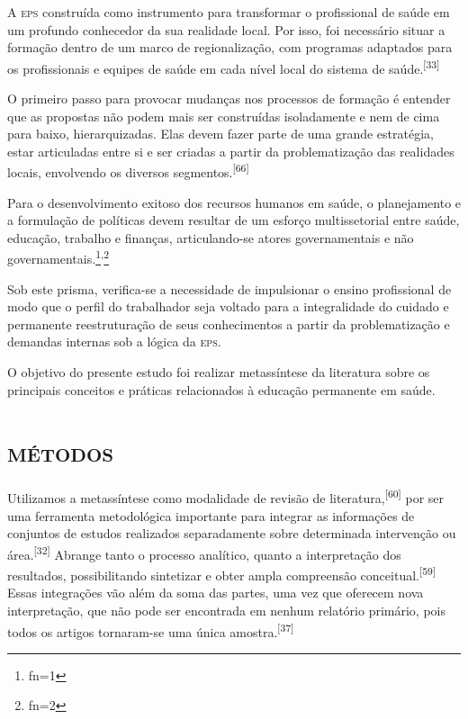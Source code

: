 \documentclass{article}
\makeatletter
\newcommand{\fn}{\afterassignment\fn@aux\count0=}
\newcommand{\fn@aux}{\csname fn\the\count0\endcsname}
\makeatother
\begin{document}
A \textsc{eps} construída como instrumento para transformar o profissional de saúde em um
profundo conhecedor da sua realidade local. Por isso, foi necessário situar a
formação dentro de um marco de regionalização, com programas adaptados para os
profissionais e equipes de saúde em cada nível local do sistema de saúde.\textsuperscript{[}\textsuperscript{33}\textsuperscript{]}

O primeiro passo para provocar mudanças nos processos de formação é entender que
as propostas não podem mais ser construídas isoladamente e nem de cima para
baixo, hierarquizadas. Elas devem fazer parte de uma grande estratégia, estar
articuladas entre si e ser criadas a partir da problematização das realidades
locais, envolvendo os diversos segmentos.\textsuperscript{[}\textsuperscript{66}\textsuperscript{]}

Para o desenvolvimento exitoso dos recursos humanos em saúde, o planejamento e a
formulação de políticas devem resultar de um esforço multissetorial entre saúde,
educação, trabalho e finanças, articulando-se atores governamentais e não
governamentais.\footnote{\fn1}\textsuperscript{,}\footnote{\fn2}

Sob este prisma, verifica-se a necessidade de impulsionar o ensino profissional
de modo que o perfil do trabalhador seja voltado para a integralidade do cuidado
e permanente reestruturação de seus conhecimentos a partir da problematização e
demandas internas sob a lógica da \textsc{eps}.

O objetivo do presente estudo foi realizar metassíntese da literatura sobre os
principais conceitos e práticas relacionados à educação permanente em saúde.

\section{\textsc{métodos}}

Utilizamos a metassíntese como modalidade de revisão de literatura,\textsuperscript{[}\textsuperscript{60}\textsuperscript{]}
por ser uma ferramenta metodológica importante para integrar as informações de
conjuntos de estudos realizados separadamente sobre determinada intervenção ou
área.\textsuperscript{[}\textsuperscript{32}\textsuperscript{]}
Abrange tanto o processo analítico, quanto a interpretação dos resultados,
possibilitando sintetizar e obter ampla compreensão conceitual.\textsuperscript{[}\textsuperscript{59}\textsuperscript{]}
Essas integrações vão além da soma das partes, uma vez que oferecem nova
interpretação, que não pode ser encontrada em nenhum relatório primário, pois
todos os artigos tornaram-se uma única amostra.\textsuperscript{[}\textsuperscript{37}\textsuperscript{]}
\end{document}
